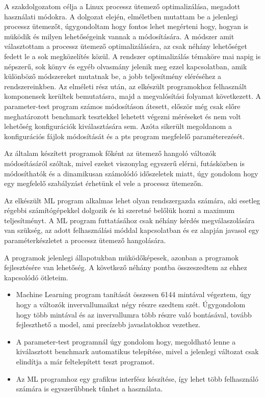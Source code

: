 
A szakdolgozatom célja a Linux processz ütemező optimalizálása, megadott használati módokra.
A dolgozat elején, elméletben mutattam be a jelenlegi processz ütemezőt, úgygondoltam hogy fontos lehet megérteni hogy, hogyan is müködik és milyen lehetőségeink vannak a módosítására.
A módszer amit választottam a processz ütemező optimalizálására, az csak néhány lehetőséget fedett le a sok megközelítés közül. A rendszer optimalizálás témaköre mai napig is népszerű, sok könyv és egyéb olvasmány jelenik meg ezzel kapcsolatban, amik különböző módszereket mutatnak be, a jobb teljesítmény eléréséhez a rendszereinkben.
Az elméleti rész után, az elkészült programokhoz felhasznált komponensek kerültek bemutatásra, majd a megvalósítási folyamat következett. A parameter-test program számos módosításon átesett, először még csak előre meghatározott benchmark tesztekkel lehetett végezni méréseket és nem volt lehetőség konfigurációk kiválasztására sem. Azóta sikerült megoldanom a konfigurációs fájlok módosítását és a pts program megfelelő paraméterezését. 

Az általam készített programok főként az ütemező hangoló változók módosításáról szóltak, mivel ezeket viszonylag egyszerű elérni, futásközben is módosíthatók és a dinamikusan számolódó időszeletek miatt, úgy gondolom hogy egy megfelelő szabályzást érhetünk el vele a processz ütemezőn.

Az elkészült ML program alkalmas lehet olyan rendszergazda számára, aki esetleg régebbi számítógépekkel dolgozik és ki szeretné belőlük hozni a maximum teljesítményt.
A ML program futtatásához csak néhány kérdés megválaszolására van szükség, az adott felhasználási móddal kapcsolatban és ez alapján javasol egy paraméterkészletet a processz ütemező hangolására.

A programok jelenlegi állapotukban müködőképesek, azonban a programok fejlesztésére van lehetőség. A következő néhány pontba összeszedtem az ehhez kapcsolódó ötleteim.
\begin{itemize}
\item Machine Learning program tanítását összesen 6144 mintával végeztem, úgy hogy a változók invervallumaikat négy részre szedtem szét. Úgygondolom hogy több mintával és az invervallumra több részre való bontásával, tovább fejleszthető a model, ami precízebb javaslatokhoz vezethez.
\item A parameter-test programnál úgy gondolom hogy, megoldható lenne a kiválasztott benchmark automatikus telepítése, mivel a jelenlegi változat csak elindítja a már feltelepített teszt programot.
\item Az ML programhoz egy grafikus interfész készítése, így lehet több felhasználó számára  is egyszerűbbnek tűnhet a használata.
\end{itemize}

